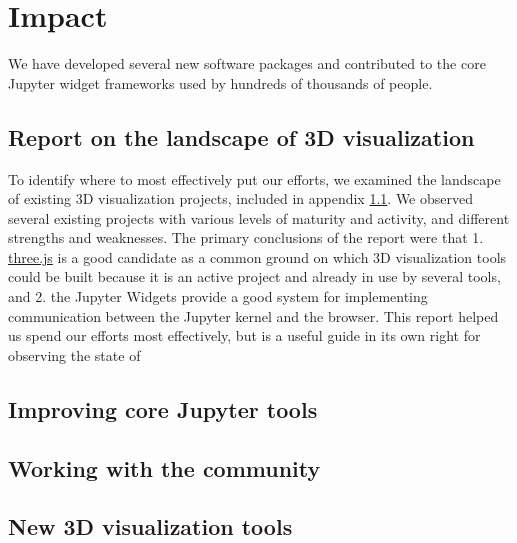 \documentclass{deliverablereport}
\begin{document}

\section{Impact}

We have developed several new software packages and contributed to the core Jupyter widget frameworks used by hundreds of thousands of people.

\subsection{Report on the landscape of 3D visualization}\label{landscape}

To identify where to most effectively put our efforts,
we examined the landscape of existing 3D visualization projects,
included in appendix \ref{landscape}.
We observed several existing projects with various levels of maturity and activity, and different strengths and weaknesses.
The primary conclusions of the report were that 1. \href{https://threejs.org}{three.js} is a good candidate as a common ground on which 3D visualization tools could be built because it is an active project and already in use by several tools, and 2. the Jupyter Widgets provide a good system for implementing communication between the Jupyter kernel and the browser.
This report helped us spend our efforts most effectively,
but is a useful guide in its own right for observing the state of


\subsection{Improving core Jupyter tools}\label{improving-core}


\subsection{Working with the community}\label{community}


\subsection{New 3D visualization tools}\label{new-3d}

\end{document}
